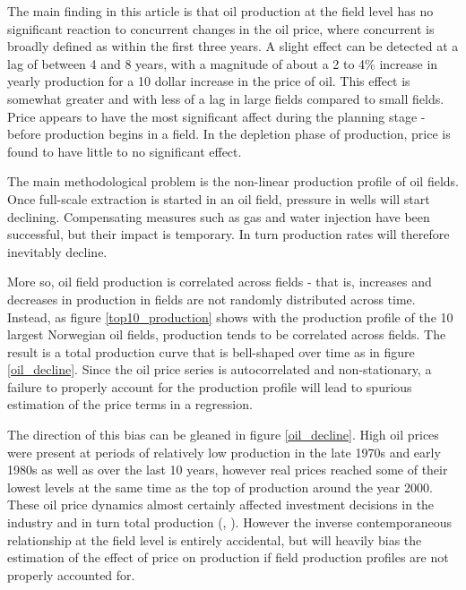 \documentclass[12pt]{article}
\begin{document}
The main finding in this article is that oil production at the field level has no significant reaction to concurrent changes in the oil price, where concurrent is broadly defined as within the first three years.  A slight effect can be detected at a lag of between 4 and 8 years, with a magnitude of about a 2 to 4\% increase in yearly production for a 10 dollar increase in the price of oil.  This effect is somewhat greater and with less of a lag in large fields compared to small fields.  Price appears to have the most significant affect during the planning stage - before production begins in a field.  In the depletion phase of production, price is found to have little to no significant effect.  

The main methodological problem is the non-linear production profile of oil fields.  Once full-scale extraction is started in an oil field, pressure in wells will start declining. Compensating measures such as gas and water injection have been successful, but their impact is temporary. In turn production rates will therefore inevitably decline.

More so, oil field production is correlated across fields - that is, increases and decreases in production in fields are not randomly distributed across time.  Instead, as figure \ref{top10_production} shows with the production profile of the 10 largest Norwegian oil fields, production tends to be correlated across fields.  The result is a total production curve that is bell-shaped over time as in figure \ref{oil_decline}.  Since the oil price series is autocorrelated and non-stationary, a failure to properly account for the production profile will lead to spurious estimation of the price terms in a regression.

The direction of this bias can be gleaned in figure \ref{oil_decline}.  High oil prices were present at periods of relatively low production in the late 1970s and early 1980s as well as over the last 10 years, however real prices reached some of their lowest levels at the same time as the top of production around the year 2000. These oil price dynamics almost certainly affected investment decisions in the industry and in turn total production (\citep{osmundsen_is_2007}, \citep{aune_financial_2010}). However the inverse contemporaneous relationship at the field level is entirely accidental, but will heavily bias the estimation of the effect of price on production if field production profiles are not properly accounted for. 
\end{document}
